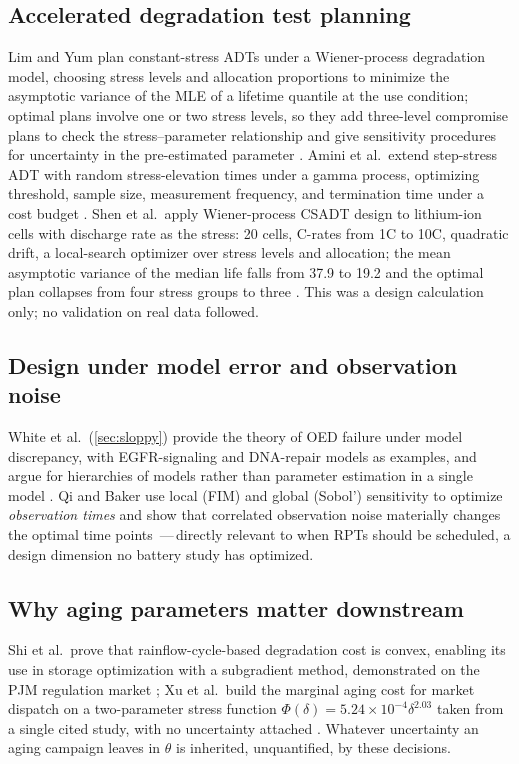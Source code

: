 \documentclass[11pt,letterpaper]{article}
\newcommand{\dash}{\,---\,}
\begin{document}
\subsection{Accelerated degradation test planning}
Lim and Yum plan constant-stress ADTs under a Wiener-process degradation model, choosing stress levels and allocation proportions to minimize the asymptotic variance of the MLE of a lifetime quantile at the use condition; optimal plans involve one or two stress levels, so they add three-level compromise plans to check the stress--parameter relationship and give sensitivity procedures for uncertainty in the pre-estimated parameter \cite{limyum2011}. Amini et al.\ extend step-stress ADT with random stress-elevation times under a gamma process, optimizing threshold, sample size, measurement frequency, and termination time under a cost budget \cite{amini2018}. Shen et al.\ apply Wiener-process CSADT design to lithium-ion cells with discharge rate as the stress: 20 cells, C-rates from 1C to 10C, quadratic drift, a local-search optimizer over stress levels and allocation; the mean asymptotic variance of the median life falls from 37.9 to 19.2 and the optimal plan collapses from four stress groups to three \cite{shen2018}. This was a design calculation only; no validation on real data followed.

\subsection{Design under model error and observation noise}
White et al.\ (\cref{sec:sloppy}) provide the theory of OED failure under model discrepancy, with EGFR-signaling and DNA-repair models as examples, and argue for hierarchies of models rather than parameter estimation in a single model \cite{white2016}. Qi and Baker use local (FIM) and global (Sobol') sensitivity to optimize \emph{observation times} and show that correlated observation noise materially changes the optimal time points \cite{qibaker2025}\dash directly relevant to when RPTs should be scheduled, a design dimension no battery study has optimized.

\subsection{Why aging parameters matter downstream}
Shi et al.\ prove that rainflow-cycle-based degradation cost is convex, enabling its use in storage optimization with a subgradient method, demonstrated on the PJM regulation market \cite{shi2017}; Xu et al.\ build the marginal aging cost for market dispatch on a two-parameter stress function $\Phi(\delta)=5.24\times10^{-4}\delta^{2.03}$ taken from a single cited study, with no uncertainty attached \cite{xu2018}. Whatever uncertainty an aging campaign leaves in $\theta$ is inherited, unquantified, by these decisions.
\end{document}
